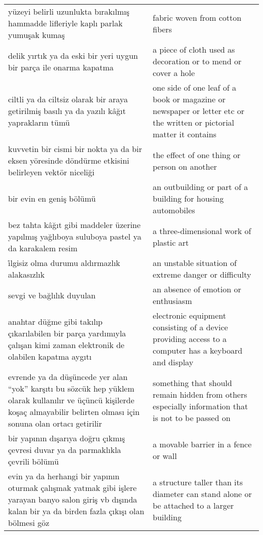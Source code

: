\begin{longtable}{p{} p{}}
    \cmidrule(rl){1-2}
    yüzeyi belirli uzunlukta bırakılmış hammadde lifleriyle kaplı parlak yumuşak kumaş & fabric woven from cotton fibers \\
    \cmidrule(rl){1-2}
    delik yırtık ya da eski bir yeri uygun bir parça ile onarma kapatma & a piece of cloth used as decoration or to mend or cover a hole \\
    \cmidrule(rl){1-2}
    ciltli ya da ciltsiz olarak bir araya getirilmiş basılı ya da yazılı kâğıt yaprakların tümü & one side of one leaf of a book or magazine or newspaper or letter etc or the written or pictorial matter it contains \\
    \cmidrule(rl){1-2}
    kuvvetin bir cismi bir nokta ya da bir eksen yöresinde döndürme etkisini  belirleyen vektör niceliği & the effect of one thing or person on another \\
    \cmidrule(rl){1-2}
    bir evin en geniş bölümü & an outbuilding or part of a building for housing automobiles \\
    \cmidrule(rl){1-2}
    bez tahta kâğıt gibi maddeler üzerine yapılmış yağlıboya suluboya pastel ya da karakalem resim & a three-dimensional work of plastic art \\
    \cmidrule(rl){1-2}
    i̇lgisiz olma durumu aldırmazlık alakasızlık & an unstable situation of extreme danger or difficulty \\
    \cmidrule(rl){1-2}
    sevgi ve bağlılık duyulan & an absence of emotion or enthusiasm \\
    \cmidrule(rl){1-2}
    anahtar düğme gibi takılıp çıkarılabilen bir parça yardımıyla çalışan kimi zaman elektronik de olabilen kapatma aygıtı & electronic equipment consisting of a device providing access to a computer has a keyboard and display \\
    \cmidrule(rl){1-2}
    evrende ya da düşüncede yer alan “yok” karşıtı bu sözcük hep yüklem olarak kullanılır ve üçüncü kişilerde koşaç almayabilir belirten olması için sonuna olan ortacı getirilir & something that should remain hidden from others especially information that is not to be passed on \\
    \cmidrule(rl){1-2}
    bir yapının dışarıya doğru çıkmış çevresi duvar ya da parmaklıkla çevrili bölümü & a movable barrier in a fence or wall \\
    \cmidrule(rl){1-2}
    evin ya da herhangi bir yapının oturmak çalışmak yatmak gibi işlere yarayan banyo salon giriş vb dışında kalan bir ya da birden fazla çıkışı olan bölmesi göz & a structure taller than its diameter can stand alone or be attached to a larger building \\

\end{longtable}
